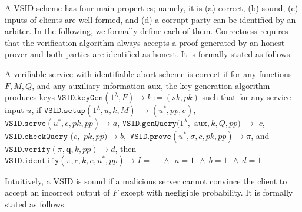 A VSID scheme  has four main properties; namely, it is (a) correct, (b) sound, (c)  inputs of clients are well-formed, and (d) a corrupt party can be identified by an arbiter. In the following, we formally define each of them.  Correctness requires that  the verification algorithm always accepts a proof generated by an honest prover and both parties are identified as honest.  It is formally stated as follows.

\begin{definition} A verifiable service with identifiable abort scheme  is  correct   if for any functions $F,M,Q$, and any auxiliary information $\text{aux}$, the key generation algorithm produces keys $\mathtt{VSID.keyGen}(1^{\lambda},F)\rightarrow k:=(sk,pk)$ such that for any service input $u$, if $\mathtt{VSID.setup}(1^{\lambda}, u,k,M)$ $\rightarrow (u^{\scriptscriptstyle *},{pp},e)$, $\mathtt{VSID.serve}(u^{\scriptscriptstyle *},e,pk,{pp})\rightarrow a$, $\mathtt{VSID.genQuery}(1^{\lambda}, $ $ \text{aux},k,Q,{pp})$ $ \rightarrow$ $ c$, $\mathtt{VSID.checkQuery}$ $(c, $ $pk,{pp})\rightarrow b,$  $\mathtt{VSID.prove}(u^{\scriptscriptstyle *},\sigma,c,pk,{pp})\rightarrow \pi$, and \\$\mathtt{VSID.verify}(\pi,\bm{q},k,{pp})\rightarrow d$, then  $\mathtt{VSID.identify}(\pi,c,k,e,u^{\scriptscriptstyle *},{pp})\rightarrow I=\bot \  \  \wedge \ \ a=1 \ \ \wedge \  b=1 \ \ \wedge \  d=1$
\end{definition}



Intuitively, a VSID is sound  if a malicious server cannot convince the client to accept an incorrect output of $F$ except with negligible probability.  It is  formally stated as follows.

